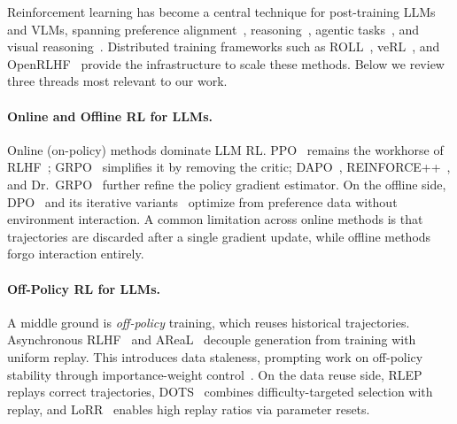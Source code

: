 \documentclass[runningheads]{llncs}
\begin{document}
Reinforcement learning has become a central technique for post-training LLMs and VLMs, spanning preference alignment~\cite{ouyang2022training}, reasoning~\cite{deepseekr1,shao2024deepseekmath}, agentic tasks~\cite{yao2023webshop,jin2025searchr1,wang2025ragen,wang2025vagen}, and visual reasoning~\cite{huang2025visionr1,shen2025vlmr1}. Distributed training frameworks such as ROLL~\cite{wang2025roll}, veRL~\cite{sheng2024verl}, and OpenRLHF~\cite{hu2024openrlhf} provide the infrastructure to scale these methods. Below we review three threads most relevant to our work.

\paragraph{Online and Offline RL for LLMs.}
Online (on-policy) methods dominate LLM RL. PPO~\cite{schulman2017ppo} remains the workhorse of RLHF~\cite{ouyang2022training}; GRPO~\cite{shao2024deepseekmath} simplifies it by removing the critic; DAPO~\cite{yu2025dapo}, REINFORCE++~\cite{hu2025reinforce++}, and Dr.~GRPO~\cite{liu2025drgrpo} further refine the policy gradient estimator. On the offline side, DPO~\cite{rafailov2023dpo} and its iterative variants~\cite{dong2024rlhfworkflow} optimize from preference data without environment interaction. A common limitation across online methods is that trajectories are discarded after a single gradient update, while offline methods forgo interaction entirely.

\paragraph{Off-Policy RL for LLMs.}
A middle ground is \emph{off-policy} training, which reuses historical trajectories. Asynchronous RLHF~\cite{noukhovitch2024async} and AReaL~\cite{areal2025} decouple generation from training with uniform replay. This introduces data staleness, prompting work on off-policy stability through importance-weight control~\cite{leroux2025topr,m2po2025,bapo2025,r2vpo2026}. On the data reuse side, RLEP~\cite{zhang2025rlep} replays correct trajectories, DOTS~\cite{dots2025} combines difficulty-targeted selection with replay, and LoRR~\cite{liu2025lorr} enables high replay ratios via parameter resets.
\end{document}
